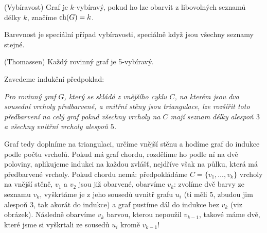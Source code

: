 \df (Vybíravost) Graf je $k$-vybíravý, pokud ho lze obarvit z libovolných
seznamů délky
$k$, značíme $\operatorname{ch}(G) = k$.

\poz Barevnost je speciální případ vybíravosti, speciálně když jsou všechny
seznamy stejné.

\vt (Thomassen) Každý rovinný graf je 5-vybíravý.

\dk Zavedeme indukční předpoklad:

{\it Pro rovinný graf $G$, který se skládá z vnějšího cyklu $C$, na kterém jsou
	dva sousední vrcholy předbarvené, a vnitřní stěny jsou triangulace, lze
	rozšířit toto předbarvení na celý graf pokud všechny vrcholy na $C$ mají
seznam délky alespoň $3$ a všechny vnitřní vrcholy alespoň $5$.}

Graf tedy doplníme na triangulaci, určíme vnější stěnu a hodíme graf do indukce
podle počtu vrcholů. Pokud má graf chordu, rozdělíme ho podle ní na dvě
poloviny, aplikujeme indukci na každou zvlášť, nejdříve však na půlku, která má
předbarvené vrcholy. Pokud chordu nemá: předpokládáme $C=\{v_1, \dots, v_k\}$
vrcholy na vnější stěně, $v_1$ a $v_2$ jsou již obarvené, obarvíme $v_k$:
zvolíme dvě barvy ze seznamu $v_k$, vyškrtáme
je z jeho sousedů uvnitř grafu $u_i$ (ti měli 5, zbudou jim alespoň 3, tak
akorát do indukce) a graf pustíme dál do indukce bez $v_k$ (viz obrázek).
Následně obarvíme $v_k$ barvou, kterou nepoužil $v_{k-1}$, takové máme dvě,
které jsme si vyškrtali ze sousedů $u_i$ kromě $v_{k-1}$!

